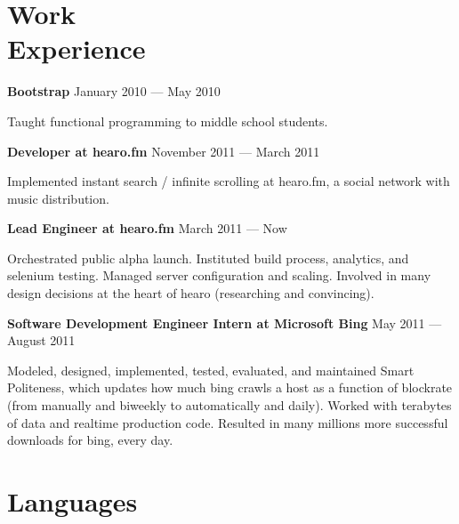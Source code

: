 \documentclass[margin,line]{resume}
\begin{document}
\begin{resume}
    \section{\mysidestyle{} Work\\Experience}

    \textbf{Bootstrap}  \hfill January 2010 — May 2010  \par\vspace{-4.0mm}   
     {\addtolength{\leftskip}{2 mm}
  Taught functional programming to middle school students.
      \par}
    
    \textbf{Developer at hearo.fm}  \hfill November 2011 — March 2011   \par\vspace{-4.0mm} 
     {\addtolength{\leftskip}{2 mm}
       Implemented instant search / infinite scrolling at hearo.fm, a social network with music distribution.
       \par}
       
    \textbf{Lead Engineer at hearo.fm} \hfill March 2011 — Now      \par\vspace{-4.0mm}
          {\addtolength{\leftskip}{2 mm}
          Orchestrated public alpha launch. Instituted build process, analytics, and selenium testing. Managed server configuration and scaling. Involved in many design decisions at the heart of hearo (researching and convincing).
      \par}

  \textbf{Software Development Engineer Intern at Microsoft Bing}  \hfill May 2011 — August 2011  \par\vspace{-4.0mm}
          {\addtolength{\leftskip}{2 mm}
           Modeled, designed, implemented, tested, evaluated, and maintained Smart Politeness, which updates how much bing crawls a host as a function of blockrate (from manually and biweekly to automatically and daily). Worked with terabytes of data and realtime production code. Resulted in many millions more successful downloads for bing, every day. 
 \par}

    \section{\mysidestyle{} Languages} 


\end{resume}
\end{document}
